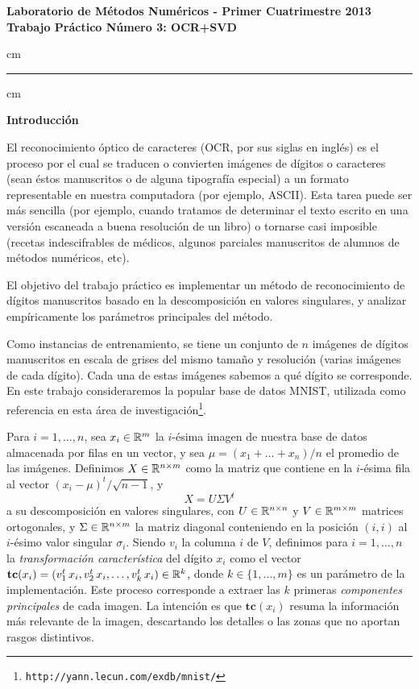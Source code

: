 \begin{centering}
\large\bf Laboratorio de M\'etodos Num\'ericos - Primer Cuatrimestre 2013 \\
\large\bf Trabajo Pr\'actico N\'umero 3: OCR+SVD\\
\end{centering}


 cm
\hrule
{} cm

{\bf Introducci\'on}

El reconocimiento \'optico de caracteres (OCR, por sus siglas en ingl\'es) es el proceso por el cual se traducen o convierten im\'agenes de d\'igitos o caracteres (sean \'estos manuscritos o de alguna tipograf\'ia especial) a un formato representable en nuestra computadora (por ejemplo, ASCII). Esta tarea puede ser m\'as sencilla (por ejemplo, cuando tratamos de determinar el texto escrito en una versi\'on escaneada a buena resoluci\'on de un libro) o tornarse casi imposible (recetas indescifrables de m\'edicos, algunos parciales manuscritos de alumnos de m\'etodos num\'ericos, etc).

El objetivo del trabajo pr\'actico es implementar un m\'etodo de reconocimiento de d\'igitos manuscritos basado en la descomposici\'on en valores singulares, y analizar emp\'iricamente los par\'ametros principales del m\'etodo.

Como instancias de entrenamiento, se tiene un conjunto de $n$ im\'agenes de d\'igitos ma\-nus\-cri\-tos en escala de grises del mismo tama\~no y resoluci\'on (varias im\'agenes de cada d\'igito). Cada una de estas im\'agenes sabemos a qu\'e d\'igito se corresponde.
En este trabajo consideraremos la popular base de datos MNIST, utilizada como referencia en esta \'area de investigaci\'on\footnote{\texttt{http://yann.lecun.com/exdb/mnist/}}. 

Para $i = 1,\ldots, n$, sea $x_i \in \mathbb{R}^{m}$ la $i$-\'esima imagen de nuestra base de datos almacenada por filas en un vector, y sea $\mu = (x_1 + \ldots + x_n)/n$ el promedio de las im\'agenes. Definimos $X\in\mathbb{R}^{n\times m}$ como la matriz que contiene en la $i$-\'esima fila al vector $(x_i - \mu)^{t}/\sqrt{n-1}$, y $$X=U \Sigma V^t$$ a su descomposici\'on en valores singulares, con $U\in\mathbb{R}^{n\times n}$ y $V\in\mathbb{R}^{m\times m}$ matrices ortogonales, y $\Sigma\in\mathbb{R}^{n\times m}$ la matriz diagonal conteniendo en la posici\'on $(i,i)$ al $i$-\'esimo valor singular $\sigma_i$.
Siendo $v_i$ la columna $i$ de $V$, definimos para $i = 1,\ldots,n$ la \textsl{transformaci\'on caracter\'istica} del d\'igito $x_{i}$ como el vector $\mathbf{tc}(x_i) = (v_1^t\, x_i, v_2^t\, x_i,\ldots,v_k^t\, x_i) \in\mathbb{R}^k$, donde $k \in\{1,\ldots,m\}$ es un par\'ametro de la implementaci\'on. Este proceso corresponde a extraer las $k$ primeras \textit{componentes principales} de cada imagen. La intenci\'on es que $\mathbf{tc}(x_i)$ resuma la informaci\'on m\'as relevante de la imagen, descartando los detalles o las zonas que no aportan rasgos distintivos.


